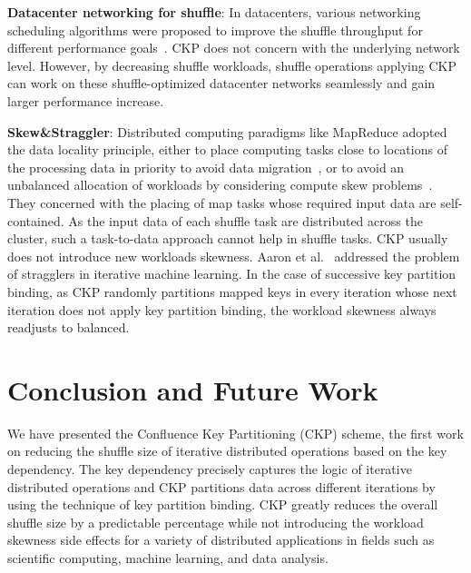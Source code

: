 \documentclass[10pt,journal,compsoc]{IEEEtran}
\begin{document}
\textbf{Datacenter networking for shuffle}: 
In datacenters, various networking scheduling algorithms were proposed to improve the shuffle throughput for different performance goals~\cite{greenberg2009vl2,popa2012faircloud,shieh2011sharing,chowdhury2011managing}.  
CKP does not concern with the underlying network level. However, by decreasing shuffle workloads, shuffle operations applying CKP can work on these shuffle-optimized datacenter networks seamlessly and gain larger performance increase.


\textbf{Skew\&Straggler}: 
Distributed computing paradigms like MapReduce adopted the data locality principle, either to place computing tasks close to locations of the processing data in priority to avoid data migration~\cite{dean2008mapreduce, zaharia2008improving}, or to avoid an unbalanced allocation of workloads by considering compute skew problems~\cite{kwon2010skew, kwon2012skewtune}. 
They concerned with the placing of map tasks whose required input data are self-contained.
As the input data of each shuffle task are distributed across the cluster, such a task-to-data approach cannot help in shuffle tasks. 
CKP usually does not introduce new workloads skewness. 
Aaron et al.~\cite{Harlap:2016:ASP} addressed the problem of stragglers in iterative machine learning. 
In the case of successive key partition binding,
as CKP randomly partitions mapped keys in every iteration 
whose next iteration does not apply key partition binding, 
the workload skewness always readjusts to balanced. 



\section{Conclusion and Future Work}\label{section:conclusion}
We have presented the Confluence Key Partitioning (CKP) scheme, the first work on reducing the shuffle size of
iterative distributed operations based on the key dependency. 
The key dependency precisely captures the logic of iterative distributed operations and CKP partitions data across different iterations by using the technique of key partition binding.
CKP greatly reduces the overall shuffle size by a predictable percentage 
while not introducing the workload skewness side effects
for a variety of distributed applications
in fields such as scientific computing, machine learning, and data
analysis.
\end{document}
